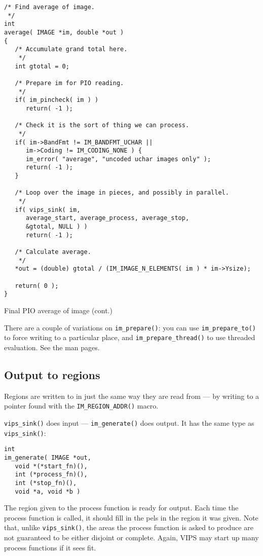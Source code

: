 \begin{fig2}
\begin{verbatim}
/* Find average of image.
 */
int
average( IMAGE *im, double *out )
{
   /* Accumulate grand total here.
    */
   int gtotal = 0;
   
   /* Prepare im for PIO reading.
    */
   if( im_pincheck( im ) )
      return( -1 );

   /* Check it is the sort of thing we can process.
    */
   if( im->BandFmt != IM_BANDFMT_UCHAR || 
      im->Coding != IM_CODING_NONE ) {
      im_error( "average", "uncoded uchar images only" );
      return( -1 );
   }

   /* Loop over the image in pieces, and possibly in parallel.
    */
   if( vips_sink( im, 
      average_start, average_process, average_stop,
      &gtotal, NULL ) )
      return( -1 );

   /* Calculate average.
    */
   *out = (double) gtotal / (IM_IMAGE_N_ELEMENTS( im ) * im->Ysize);

   return( 0 );
} 
\end{verbatim}
\caption{Final PIO average of image (cont.)}
\end{fig2}

There are a couple of variations on \verb+im_prepare()+: you can use
\verb+im_prepare_to()+ to force writing to a particular place, and
\verb+im_prepare_thread()+ to use threaded evaluation. See the man pages.

\subsection{Output to regions}
\label{sec:generate}

Regions are written to in just the same way they are read from --- by
writing to a pointer found with the \verb+IM_REGION_ADDR()+ macro.

\verb+vips_sink()+ does input --- \verb+im_generate()+ does output. It
has the same type as \verb+vips_sink()+:

\begin{verbatim}
int 
im_generate( IMAGE *out,
   void *(*start_fn)(), 
   int (*process_fn)(), 
   int (*stop_fn)(),
   void *a, void *b )    
\end{verbatim}

The region given to the process function is ready for output. Each time
the process function is called, it should fill in the pels in the region
it was given. Note that, unlike \verb+vips_sink()+, the areas the process
function is asked to produce are not guaranteed to be either disjoint or
complete. Again, VIPS may start up many process functions if it sees fit.

